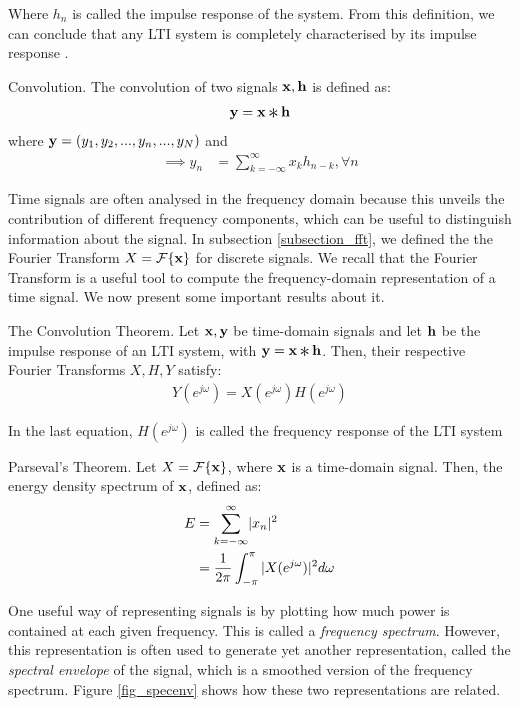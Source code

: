 \documentclass[../main.tex]{subfiles}
\begin{document}
\par Where $h_{n}$ is called the impulse response of the system. From this definition, we can conclude that any LTI system is completely characterised by its impulse response \cite{Oppenheim2010}.  
\begin{definition}{Convolution.} \label{def_convolution}
The convolution of two signals $\mathbf{x, h}$ is defined as:
\begin{align*}
\V{y} &= \V{x} \Conv \V{h}\\
\end{align*}
where $\mathbf{y} = (y_1, y_2, ..., y_n, ..., y_N)$ and
\begin{align*}
\implies y_n &= \sum_{k=-\infty}^{\infty}x_kh_{n-k}, \forall n
\end{align*}
\end{definition}
\par Time signals are often analysed in the frequency domain because this unveils the contribution of different frequency components, which can be useful to distinguish information about the signal. In subsection \ref{subsection_fft}, we defined the the Fourier Transform $X = \mathcal{F}\{\mathbf{x}\}$ for discrete signals. We recall that the Fourier Transform is a useful tool to compute the frequency-domain representation of a time signal. We now present some important results about it.
\begin{theorem}{The Convolution Theorem.} \label{theo_conv}
Let $\mathbf{x, y}$ be time-domain signals and let $\mathbf{h}$ be the impulse response of an LTI system, with $\V{y} = \V{x}\Conv\V{h}$. Then, their respective Fourier Transforms $X, H, Y$ satisfy:
\begin{align*}
Y(e^{j\omega}) = X(e^{j\omega})H(e^{j\omega})
\end{align*}
\end{theorem}
\par In the last equation, $H(e^{j\omega})$ is called the frequency response of the LTI system
\begin{theorem}{Parseval's Theorem.} \label{theo_parseval}
Let $X = \mathcal{F}\{\mathbf{x}\}$, where $\mathbf{x}$ is a time-domain signal. Then, the energy density spectrum of $\mathbf{x}$, defined as:
\begin{align*}
E &= \sum_{k=-\infty}^{\infty}\lvert x_n\rvert^2\\
&= \frac{1}{2\pi}\int_{-\pi}^\pi{\lvert X(e^{j\omega})\rvert^2d\omega}
\end{align*}
\end{theorem}
\par One useful way of representing signals is by plotting how much power is contained at each given frequency. This is called a \emph{frequency spectrum}. However, this representation is often used to generate yet another representation, called the \emph{spectral envelope} of the signal, which is a smoothed version of the frequency spectrum. Figure \ref{fig_specenv} shows how these two representations are related.
\end{document}
